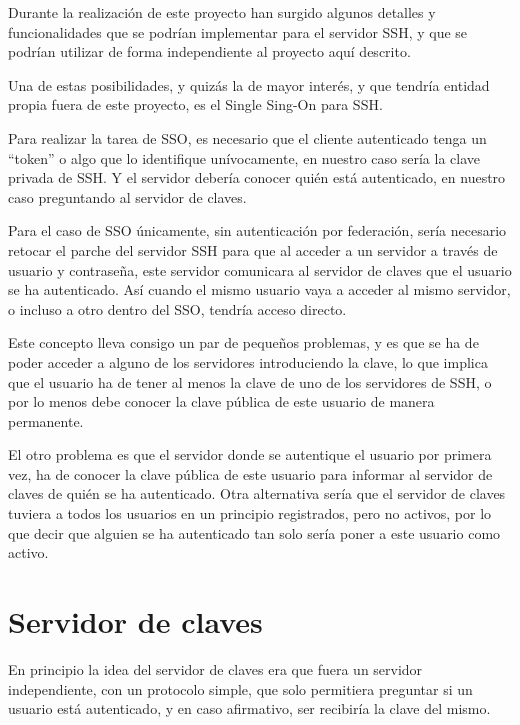         Durante la realización de este proyecto han surgido algunos
        detalles y funcionalidades que se podrían implementar para el
        servidor SSH, y que se podrían utilizar de forma independiente al
        proyecto aquí descrito.

        Una de estas posibilidades, y quizás la de mayor interés, y que
        tendría entidad propia fuera de este proyecto, es el Single Sing-On
        para SSH.

        Para realizar la tarea de SSO, es necesario que el cliente
        autenticado tenga un ``token'' o algo que lo identifique
        unívocamente, en nuestro caso sería la clave privada de SSH. Y el
        servidor debería conocer quién está autenticado, en nuestro caso
        preguntando al servidor de claves.

        Para el caso de SSO únicamente, sin autenticación por federación,
        sería necesario retocar el parche del servidor SSH para que al
        acceder a un servidor a través de usuario y contraseña, este
        servidor comunicara al servidor de claves que el usuario se ha
        autenticado. Así cuando el mismo usuario vaya a acceder al mismo
        servidor, o incluso a otro dentro del SSO, tendría acceso directo.

        Este concepto lleva consigo un par de pequeños problemas, y es que
        se ha de poder acceder a alguno de los servidores introduciendo la
        clave, lo que implica que el usuario ha de tener al menos la clave
        de uno de los servidores de SSH, o por lo menos debe conocer la
        clave pública de este usuario de manera permanente.

        El otro problema es que el servidor donde se autentique el usuario
        por primera vez, ha de conocer la clave pública de este usuario
        para informar al servidor de claves de quién se ha autenticado.
        Otra alternativa sería que el servidor de claves tuviera a todos
        los usuarios en un principio registrados, pero no activos, por lo
        que decir que alguien se ha autenticado tan solo sería poner a este
        usuario como activo.
    
    \section{Servidor de claves}

    En principio la idea del servidor de claves era que fuera un servidor
    independiente, con un protocolo simple, que solo permitiera preguntar
    si un usuario está autenticado, y en caso afirmativo, ser recibiría la
    clave del mismo.

